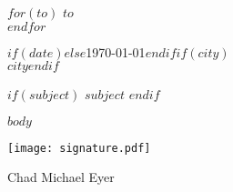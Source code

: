 \documentclass[$fontsize$, letter]{article}
\begin{document}
\small

\vspace{1em}

\normalsize \sffamily
$for(to)$
$to$\\
$endfor$

\vspace{3em}

\rmfamily
\begin{flushright}
  $if(date)$$else$\today$endif$$if(city)$\\$city$$endif$
\end{flushright}

\vspace{1em}

$if(subject)$
\textbf{$subject$}
$endif$

\vspace{1em}

$body$

{
    \begin{FlushRight}  	\parbox[t]{0.6in}{\texttt{[image: signature.pdf]}}
    \vspace*{-3\baselineskip}Chad Michael Eyer
    \end{FlushRight}
}
\end{document}
